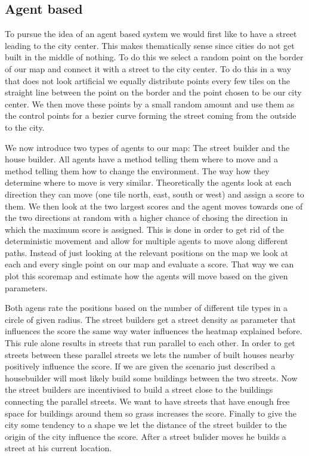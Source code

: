 \documentclass{scrartcl}
\begin{document}
\subsection{Agent based}
To pursue the idea of an agent based system we would first like to have a street
leading to the city center. This makes thematically sense since cities do not get
built in the middle of nothing. To do this we select a random point on the border
of our map and connect it with a street to the city center. To do this in a way
that does not look artificial we equally distribute points every few tiles on
the straight line between the point on the border and the point chosen to be our
city center. We then move these points by a small random amount and use them as the
control points for a bezier curve forming the street coming from the outside to
the city.

We now introduce two types of agents to our map: The street builder and the house builder.
All agents have a method telling them where to move and a method telling them
how to change the environment. The way how they determine where to move is very similar.
Theoretically the agents look at each direction they can move (one tile north, east, south or west)
and assign a score to them. We then look at the two largest scores and the agent
moves towards one of the two directions at random with a higher chance of chosing
the direction in which the maximum score is assigned. This is done in order to
get rid of the deterministic movement and allow for multiple agents to move along
different paths. Instead of just looking at the relevant positions on the map we
look at each and every single point on our map and evaluate a score. That way we
can plot this scoremap and estimate how the agents will move based on the given
parameters.

Both agens rate the positions based on the number of different tile types in a
circle of given radius. The street builders get a street density as parameter
that influences the score the same way water influences the heatmap explained before.
This rule alone results in streets that run parallel to each other. In order to
get streets between these parallel streets we lets the number of built houses nearby
positively influence the score. If we are given the scenario just described
a housebuilder will most likely build some buildings between the two streets.
Now the street builders are incentivised to build a street close to the buildings
connecting the parallel streets.
We want to have streets that have enough free space for buildings around them
so grass increases the score. Finally to give the city some tendency to a shape
we let the distance of the street builder to the origin of the city influence the score.
After a street bulider moves he builds a street at his current location.
\end{document}
